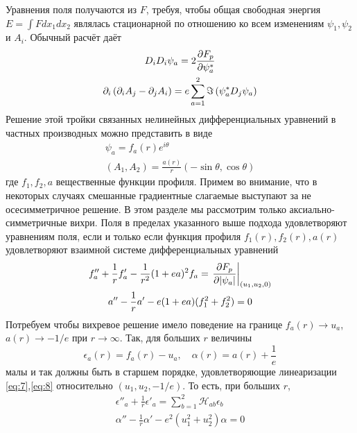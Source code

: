 Уравнения поля получаются из \( F \), требуя, чтобы общая свободная энергия 
\( E = \int F dx_1 dx_2 \) являлась стационарной по отношению ко всем 
изменениям \( \psi_1, \psi_2 \) и \( A_i \). Обычный расчёт даёт 
\begin{gather}
    D_i D_i \psi_a = 2\frac{\partial F_p}{\partial \psi_a^{*}}
    \label{eq:4} \\
    \partial_i \left( \partial_i A_j - \partial_j A_i \right) = 
        e\sum\limits_{a=1}^{2}\Im\left( \psi_a^* D_j \psi_a \right)
    \label{eq:5}
\end{gather}
Решение этой тройки связанных нелинейных дифференциальных уравнений в частных 
производных можно представить в виде
\begin{gather}
    \psi_a = f_a(r)e^{i\theta} \nonumber \\
    (A_1, A_2) = \frac{a(r)}{r}(-\sin\theta, \cos\theta)
    \label{eq:6}
\end{gather}
где \( f_1, f_2, a \) вещественные функции профиля. Примем во внимание, что 
в некоторых случаях смешанные градиентные слагаемые выступают за не 
осесимметричное решение. В этом разделе мы рассмотрим только 
аксиально-симметричные вихри. Поля в пределах указанного выше подхода 
удовлетворяют уравнениям поля, если и только если функция профиля 
\( f_1(r), f_2(r), a(r) \) удовлетворяют взаимной системе дифференциальных 
уравнений
\begin{gather}
    f''_a + \frac{1}{r} f'_a - \frac{1}{r^2}(1+ea)^2 f_a = 
        \left. \frac{\partial F_p}{\partial |\psi_a|} \right|_{(u_1, u_2, 0)}
    \label{eq:7} \\
    a'' - \frac{1}{r} a' - e(1+ea)(f_1^2+f_2^2) = 0
    \label{eq:8}
\end{gather}
Потребуем чтобы вихревое решение имело поведение на границе
\( f_a(r) \rightarrow u_a \), \( a(r) \rightarrow -1/e \) при
\( r \rightarrow \infty \). Так, для больших \( r \) величины
\begin{equation}
    \epsilon_a(r) = f_a(r) - u_a, \quad
    \alpha(r) = a(r) + \frac{1}{e}
    \label{eq:9}
\end{equation}
малы и так должны быть в старшем порядке, удовлетворяющие линеаризации 
\eqref{eq:7},\eqref{eq:8} относительно \( (u_1, u_2, -1/e) \). То есть, при 
больших \( r \),
\begin{gather}
    \epsilon''_a + \frac{1}{r} \epsilon'_a = \sum\limits_{b=1}^{2}
        \mathcal{H}_{ab} \epsilon_b
    \label{eq:10} \\
    \alpha'' - \frac{1}{r} \alpha' - e^2(u_1^2 + u_2^2 )\alpha = 0
    \label{eq:11}
\end{gather}
